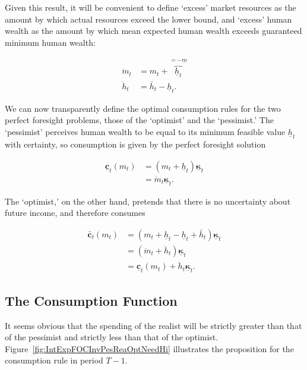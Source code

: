 \documentclass[twocolumn, switch]{article}
\newcommand{\mNrm}{m}
\newcommand{\cFunc}{\mathbf{c}}
\newcommand{\cFuncOpt}{\bar{\cFunc}}
\newcommand{\hNrm}{h}
\newcommand{\hNrmOpt}{\bar{\hNrm}}
\newcommand{\MPC}{\boldsymbol{\kappa}}
\newcommand{\MPCmin}{\underline{\MPC}}
\newcommand{\hNrmPes}{\underline{\hNrm}}
\newcommand{\mNrmMin}{\underline{\mNrm}}
\newcommand{\mNrmEx}{\ddot{\mNrm}}
\newcommand{\hNrmEx}{\ddot{\hNrm}}
\newcommand{\cFuncPes}{\underline{\cFunc}}
\begin{document}
Given this result, it will be convenient to define `excess' market resources as
the amount by which actual resources exceed the lower bound, and `excess' human
wealth as the amount by which mean expected human wealth exceeds guaranteed
minimum human wealth:

\begin{equation}
\begin{aligned}
\mNrmEx_{t} &= \mNrm_{t}+\overbrace{\hNrmPes_{t}}^{=-\mNrmMin} \\
\hNrmEx_{t} &= \hNrmOpt_{t}-\hNrmPes_{t}.
\end{aligned}
\end{equation}

We can now transparently define the optimal consumption rules for the two
perfect foresight problems, those of the `optimist' and the `pessimist.' The
`pessimist' perceives human wealth to be equal to its minimum feasible value
$\hNrmPes_{t}$ with certainty, so consumption is given by the perfect foresight
solution

\begin{equation}
\begin{aligned}
\cFuncPes_{t}(\mNrm_{t}) &= (\mNrm_{t}+\hNrmPes_{t})\MPCmin_{t} \\
&= \mNrmEx_{t}\MPCmin_{t} .
\end{aligned}
\end{equation}

The `optimist,' on the other hand, pretends that there is no uncertainty about
future income, and therefore consumes

\begin{equation}
\begin{aligned}
\cFuncOpt_{t}(\mNrm_{t}) &= (\mNrm_{t} +\hNrmPes_{t} - \hNrmPes_{t} + \hNrmOpt_{t} )\MPCmin_{t} \\
&= (\mNrmEx_{t} + \hNrmEx_{t})\MPCmin_{t} \\
&= \cFuncPes_{t}(\mNrm_{t})+\hNrmEx_{t} \MPCmin_{t} .
\end{aligned}
\end{equation}

\subsection{The Consumption Function}

It seems obvious that the spending of the realist will be strictly greater than
that of the pessimist and strictly less than that of the optimist.
Figure~\ref{fig:IntExpFOCInvPesReaOptNeedHi} illustrates the proposition for the
consumption rule in period $T -1$.
\end{document}
